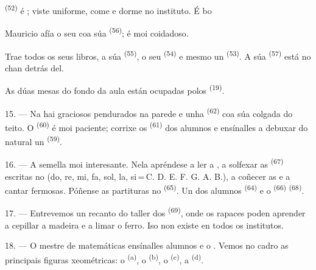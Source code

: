  \textsuperscript{(52)} é ; viste uniforme, come e
dorme no instituto. É bo 

Mauricio afía o seu  coa súa 
\textsuperscript{(56)}; é moi coidadoso.

Trae todos os seus libros, a súa  \textsuperscript{(55)}, o seu
 \textsuperscript{(54)} e mesmo un 
\textsuperscript{(53)}. A súa  \textsuperscript{(57)} está no chan
detrás del.

As dúas mesas do fondo da aula están ocupadas polos 
\textsuperscript{(19)}.

\VUsaut{4.6mm}
\VUsaut{3.4mm}

15. --- Na  hai  graciosos pendurados na
parede e unha  \textsuperscript{(62)} coa súa 
colgada do teito. O  \textsuperscript{(60)} é moi paciente; corrixe os
 \textsuperscript{(61)} dos alumnos e ensínalles a debuxar do natural
un  \textsuperscript{(59)}.

16. --- A  semella moi interesante. Nela apréndese a ler a
, a solfexar as  \textsuperscript{(67)}
escritas no  (do, re, mi, fa, sol, la,
si\,=\,C. D. E. F. G. A. B.), a coñecer as  e a cantar
 fermosas. Póñense as partituras no 
\textsuperscript{(65)}. Un dos alumnos 
\textsuperscript{(64)} e o  \textsuperscript{(66)}
 \textsuperscript{(68)}.

17. --- Entrevemos un recanto do taller dos 
\textsuperscript{(69)}, onde os rapaces poden aprender a cepillar a madeira e a limar
o ferro. Iso non existe en todos os institutos.

\VUsaut{5.0mm}
\VUsaut{3.6mm}

18. --- O mestre de matemáticas ensínalles  alumnos
 e o . Vemos no cadro
as principais figuras xeométricas: o  \textsuperscript{(a)}, o
 \textsuperscript{(b)}, o  \textsuperscript{(c)}, a
 \textsuperscript{(d)}.

